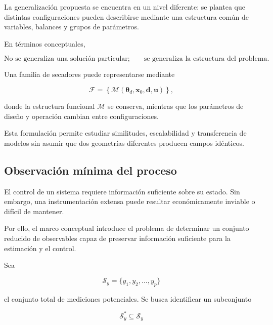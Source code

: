 La generalización propuesta se encuentra en un nivel diferente: se plantea que distintas configuraciones pueden describirse mediante una estructura común de variables, balances y grupos de parámetros.

En términos conceptuales,

\begin{equation}
\boxed{
\text{No se generaliza una solución particular;}
\qquad
\text{se generaliza la estructura del problema.}
}
\label{eq:generalizacion_estructura}
\end{equation}

Una familia de secadores puede representarse mediante

\begin{equation}
\mathcal{F}
=
\left\{
\mathcal{M}
\left(
\boldsymbol{\theta}_d,
\mathbf{x}_0,
\mathbf{d},
\mathbf{u}
\right)
\right\},
\end{equation}

donde la estructura funcional $\mathcal{M}$ se conserva, mientras que los parámetros de diseño y operación cambian entre configuraciones.

Esta formulación permite estudiar similitudes, escalabilidad y transferencia de modelos sin asumir que dos geometrías diferentes producen campos idénticos.

\subsection{Observación mínima del proceso}
\label{subsec:observacion_minima}

El control de un sistema requiere información suficiente sobre su estado. Sin embargo, una instrumentación extensa puede resultar económicamente inviable o difícil de mantener.

Por ello, el marco conceptual introduce el problema de determinar un conjunto reducido de observables capaz de preservar información suficiente para la estimación y el control.

Sea

\begin{equation}
\mathcal{S}_y
=
\{y_1,y_2,\ldots,y_p\}
\end{equation}

el conjunto total de mediciones potenciales. Se busca identificar un subconjunto

\begin{equation}
\mathcal{S}_y^{*}
\subseteq
\mathcal{S}_y
\end{equation}

